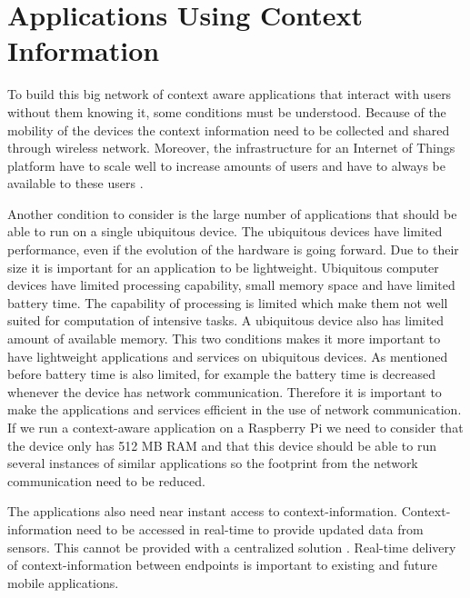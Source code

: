 \section{Applications Using Context Information}
To build this big network of context aware applications that interact with users without them knowing it, some conditions must be understood. Because of the mobility of the devices the context information need to be collected and shared through wireless network. Moreover, the infrastructure for an Internet of Things platform have to scale well to increase amounts of users and have to always be available to these users \cite{Kanter539187}.

Another condition to consider is the large number of applications that should be able to run on a single ubiquitous device. The ubiquitous devices have limited performance, even if the evolution of the hardware is going forward. Due to their size it is important for an application to be lightweight. Ubiquitous computer devices have limited processing capability, small memory space and have limited battery time. The capability of processing is limited which make them not well suited for computation of intensive tasks. A ubiquitous device also has limited amount of available memory. This two conditions makes it more important to have lightweight applications and services on ubiquitous devices. As mentioned before battery time is also limited, for example the battery time is decreased whenever the device has network communication. Therefore it is important to make the applications and services efficient in the use of network communication. 
If we run a context-aware application on a Raspberry Pi we need to consider that the device only has 512 MB RAM and that this device should be able to run several instances of similar applications so the footprint from the network communication need to be reduced. 

The applications also need near instant access to context-information. Context-information need to be accessed in real-time to provide updated data from sensors. This cannot be provided with a centralized solution \cite{TheMediaSenseFramework}. Real-time delivery of context-information between endpoints is important to existing and future mobile applications. 
